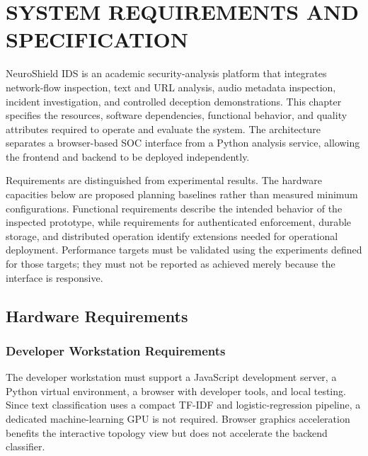 \documentclass[12pt,a4paper,oneside]{report}
\begin{document}
\justifying
\setcounter{chapter}{2}
\chapter{SYSTEM REQUIREMENTS AND SPECIFICATION}

NeuroShield IDS is an academic security-analysis platform that integrates network-flow inspection, text and URL analysis, audio metadata inspection, incident investigation, and controlled deception demonstrations. This chapter specifies the resources, software dependencies, functional behavior, and quality attributes required to operate and evaluate the system. The architecture separates a browser-based SOC interface from a Python analysis service, allowing the frontend and backend to be deployed independently.

Requirements are distinguished from experimental results. The hardware capacities below are proposed planning baselines rather than measured minimum configurations. Functional requirements describe the intended behavior of the inspected prototype, while requirements for authenticated enforcement, durable storage, and distributed operation identify extensions needed for operational deployment. Performance targets must be validated using the experiments defined for those targets; they must not be reported as achieved merely because the interface is responsive.

\section{Hardware Requirements}

\subsection{Developer Workstation Requirements}

The developer workstation must support a JavaScript development server, a Python virtual environment, a browser with developer tools, and local testing. Since text classification uses a compact TF-IDF and logistic-regression pipeline, a dedicated machine-learning GPU is not required. Browser graphics acceleration benefits the interactive topology view but does not accelerate the backend classifier.
\end{document}
